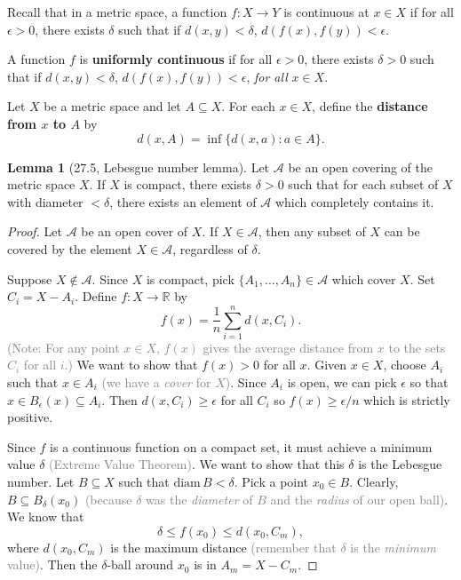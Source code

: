 \documentclass{article}
\newcommand{\nline}{\vspace*{0.5\baselineskip}}
\newcommand{\com}[1]{\textcolor{grey}{#1}}
\theoremstyle{definition}
\newtheorem{lemma}{Lemma}[subsection]
\begin{document}
\begin{flushleft}
Recall that in a metric space, a function $f: X \to Y$ is continuous at $x \in X$ if for all $\epsilon > 0$, there exists $\delta$ such that if $d(x,y) < \delta$, $d(f(x),f(y)) < \epsilon$.

\nline

A function $f$ is \textbf{uniformly continuous} if for all $\epsilon > 0$, there exists $\delta > 0$ such that if $d(x,y) < \delta$, $d(f(x),f(y)) < \epsilon$, \textit{for all} $x \in X$.

\nline

Let $X$ be a metric space and let $A \subseteq X$. For each $x \in X$, define the \textbf{distance from $x$ to $A$} by
\[
d(x,A) = \inf \{ d(x,a) : a \in A \}.
\]

\begin{lemma}[27.5, Lebesgue number lemma]
Let $\mathcal{A}$ be an open covering of the metric space $X$. If $X$ is compact, there exists $\delta > 0$ such that for each subset of $X$ with diameter $< \delta$, there exists an element of $\mathcal{A}$ which completely contains it.
\end{lemma}

\begin{proof}
Let $\mathcal{A}$ be an open cover of $X$. If $X \in \mathcal{A}$, then any subset of $X$ can be covered by the element $X \in \mathcal{A}$, regardless of $\delta$.

\nline

Suppose $X \notin \mathcal{A}$. Since $X$ is compact, pick $\{A_1,\dots,A_n\} \in \mathcal{A}$ which cover $X$. Set $C_i = X - A_i$. Define $f : X \to \mathbb{R}$ by
\[
f(x) = \frac{1}{n} \sum_{i=1}^n d(x,C_i).
\]
\com{(Note: For any point $x \in X$, $f(x)$ gives the average distance from $x$ to the sets $C_i$ for all $i$.)} We want to show that $f(x) > 0$ for all $x$. Given $x \in X$, choose $A_i$ such that $x \in A_i$ \com{(we have a \textit{cover} for $X$)}. Since $A_i$ is open, we can pick $\epsilon$ so that $x \in B_\epsilon(x) \subseteq A_i$. Then $d(x,C_i) \geq \epsilon$ for all $C_i$ so $f(x) \geq \epsilon/n$ which is strictly positive.

\nline

Since $f$ is a continuous function on a compact set, it must achieve a minimum value $\delta$ \com{(Extreme Value Theorem)}. We want to show that this $\delta$ is the Lebesgue number. Let $B \subseteq X$ such that $\text{diam} \, B < \delta$. Pick a point $x_0 \in B$. Clearly, $B \subseteq B_\delta(x_0)$ \com{(because $\delta$ was the \textit{diameter} of $B$ and the \textit{radius} of our open ball)}. We know that
\[
\delta \leq f(x_0) \leq d(x_0,C_m),
\]
where $d(x_0,C_m)$ is the maximum distance \com{(remember that $\delta$ is the \textit{minimum} value)}. Then the $\delta$-ball around $x_0$ is in $A_m = X - C_m$.
\end{proof}


\end{flushleft}
\end{document}
